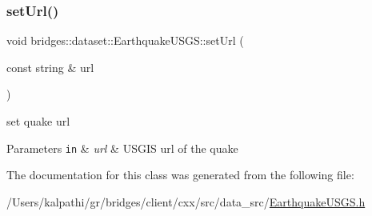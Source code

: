 \subsubsection{\texorpdfstring{set\+Url()}{setUrl()}}
{\footnotesize\ttfamily void bridges\+::dataset\+::\+Earthquake\+U\+S\+G\+S\+::set\+Url (\begin{DoxyParamCaption}\item[{const string \&}]{url }\end{DoxyParamCaption})\hspace{0.3cm}{\ttfamily [inline]}}



set quake url 


\begin{DoxyParams}[1]{Parameters}
\mbox{\tt in}  & {\em url} & U\+S\+G\+IS url of the quake \\
\hline
\end{DoxyParams}


The documentation for this class was generated from the following file\+:\begin{DoxyCompactItemize}
\item 
/\+Users/kalpathi/gr/bridges/client/cxx/src/data\+\_\+src/\mbox{\hyperlink{_earthquake_u_s_g_s_8h}{Earthquake\+U\+S\+G\+S.\+h}}\end{DoxyCompactItemize}
